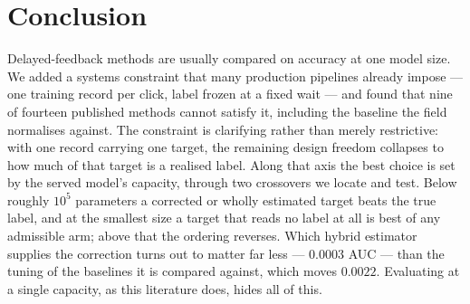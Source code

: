 \documentclass[runningheads]{llncs}
\begin{document}
\section{Conclusion}

Delayed-feedback methods are usually compared on accuracy at one model size. We added a systems
constraint that many production pipelines already impose --- one training record per click, label
frozen at a fixed wait --- and found that nine of fourteen published methods cannot satisfy it,
including the baseline the field normalises against. The constraint is clarifying rather than merely
restrictive: with one record carrying one target, the remaining design freedom collapses to how much
of that target is a realised label. Along that axis the best choice is set by the served model's
capacity, through two crossovers we locate and test. Below roughly $10^{5}$ parameters a corrected
or wholly estimated target beats the true label, and at the smallest size a target that reads no
label at all is best of any admissible arm; above that the ordering reverses. Which hybrid estimator
supplies the correction turns out to matter far less --- $0.0003$ AUC --- than the tuning of the
baselines it is compared against, which moves $0.0022$. Evaluating at a single capacity, as this
literature does, hides all of this.



\end{document}
